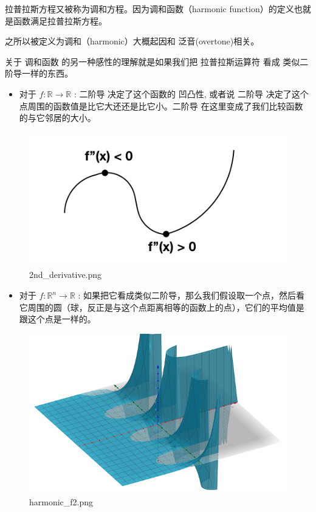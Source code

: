 \documentclass[
]{book}
\providecommand{\tightlist}{%
  \setlength{\itemsep}{0pt}\setlength{\parskip}{0pt}}
\begin{document}
拉普拉斯方程又被称为调和方程。因为调和函数（harmonic function）的定义也就是函数满足拉普拉斯方程。

之所以被定义为调和（harmonic）大概起因和 泛音(overtone)相关。

关于 调和函数 的另一种感性的理解就是如果我们把 拉普拉斯运算符 看成 类似二阶导一样的东西。

\begin{itemize}
\tightlist
\item
  对于 \(f: \mathbb{R} \to \mathbb{R}\) : 二阶导 决定了这个函数的 凹凸性, 或者说 二阶导 决定了这个点周围的函数值是比它大还还是比它小。二阶导 在这里变成了我们比较函数的与它邻居的大小。
\end{itemize}

\begin{figure}
\centering
\includegraphics{images/2nd_derivative.png}
\caption{2nd\_derivative.png}
\end{figure}

\begin{itemize}
\tightlist
\item
  对于 \(f: \mathbb{R}^n \to \mathbb{R}\) : 如果把它看成类似二阶导，那么我们假设取一个点，然后看它周围的圆（球，反正是与这个点距离相等的函数上的点），它们的平均值是跟这个点是一样的。
\end{itemize}

\begin{figure}
\centering
\includegraphics{images/harmonic_f2.png}
\caption{harmonic\_f2.png}
\end{figure}
\end{document}
